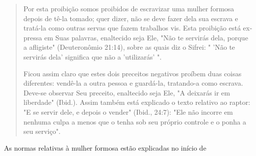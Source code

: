 \begin{quote}
Por esta proibição somos proibidos de escravizar uma mulher for­mosa
depois de tê-la tomado; quer dizer, não se deve fazer dela sua escrava e
tratá-la como outras servas que fazem trabalhos vis. Esta proibição está
ex­pressa em Suas palavras, enaltecido seja Ele, "Não te servirás dela,
porque a afligiste" (Deuteronômio 21:14), sobre as quais diz o Sifrei: "
'Não te servirás dela' significa que não a 'utilizarás' ".

Ficou assim claro que estes dois preceitos negativos proíbem duas coisas
diferentes: vendê-la a outra pessoa e guardá-la, tratando-a como
escrava. Deve-se observar Seu preceito, enaltecido seja Ele, "A deixarás
ir em liberda­de" (Ibid.). Assim também está explicado o texto relativo
ao raptor: "E se ser­vir dele, e depois o vender" (Ibid., 24:7): "Ele
não incorre em nenhuma culpa a menos que o tenha sob seu próprio
controle e o ponha a seu serviço".
\end{quote}

As normas relativas à mulher formosa estão explicadas no início de

